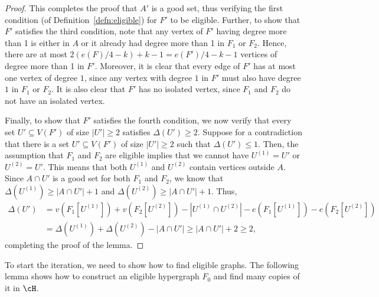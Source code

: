 \begin{proof}
This completes the proof that $A'$ is a good set, thus verifying the first condition (of Definition~\ref{defn:eligible}) for $F'$ to be eligible. Further, to show that $F'$ satisfies the third condition, note that any vertex of $F'$ having degree more than 1 is either in $A$ or it already had degree more than 1 in $F_1$ or $F_2$. Hence, there are at most $2(e(F)/4-k)+k-1=e(F')/4-k-1$ vertices of degree more than 1 in $F'$. Moreover, it is clear that every edge of $F'$ has at most one vertex of degree $1$, since any vertex with degree $1$ in $F'$ must also have degree $1$ in $F_1$ or $F_2$. It is also clear that $F'$ has no isolated vertex, since $F_1$ and $F_2$ do not have an isolated vertex.

Finally, to show that $F'$ satisfies the fourth condition, we now verify that every set $U'\subseteq V(F')$ of size $|U'|\geq 2$ satisfies $\Delta(U')\geq 2$. Suppose for a contradiction that there is a set $U'\subseteq V(F')$ of size $|U'|\geq 2$ such that $\Delta(U')\leq 1$. Then, the assumption that $F_1$ and $F_2$ are eligible implies that we cannot have $U^{(1)}=U'$ or $U^{(2)}=U'$. This means that both $U^{(1)}$ and $U^{(2)}$ contain vertices outside $A$. Since $A\cap U'$ is a good set for both $F_1$ and $F_2$, we know that $\Delta(U^{(1)})\geq |A\cap U'|+1$ and $\Delta(U^{(2)})\geq |A\cap U'|+1$. Thus, 
\begin{align*}
    \Delta(U')&=v(F_1[U^{(1)}])+v(F_2[U^{(2)}])-|U^{(1)}\cap U^{(2)}|-e(F_1[U^{(1)}])-e(F_2[U^{(2)}])\\
    &=\Delta(U^{(1)})+\Delta(U^{(2)})-|A\cap U'|\geq |A\cap U'|+2\geq 2,
\end{align*}
completing the proof of the lemma.
\end{proof}

\noindent
To start the iteration, we need to show how to find eligible graphs. The following lemma shows how to construct an eligible hypergraph $F_0$ and find many copies of it in $\cH$.

